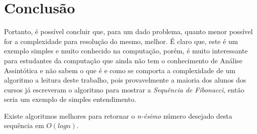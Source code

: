 \documentclass[a4paper, 12pt]{article}
\begin{document}
\section{Conclusão}

Portanto, é possível concluir que, para um dado problema, quanto menor possível for a complexidade para resolução do mesmo, melhor. É claro que, este é um exemplo simples e muito conhecido na computação, porém, é muito interessante para estudantes da computação que ainda não tem o conhecimento de Análise Assintótica e não sabem o que é e como se comporta a complexidade de um algoritmo a leitura deste trabalho, pois provavelmente a maioria dos alunos dos cursos já escreveram o algoritmo para mostrar a {\it Sequência de Fibonacci}, então seria um exemplo de simples entendimento.

Existe algoritmos melhores para retornar o {\it n-ésimo} número desejado desta sequência em $O(logn)$.
\end{document}
